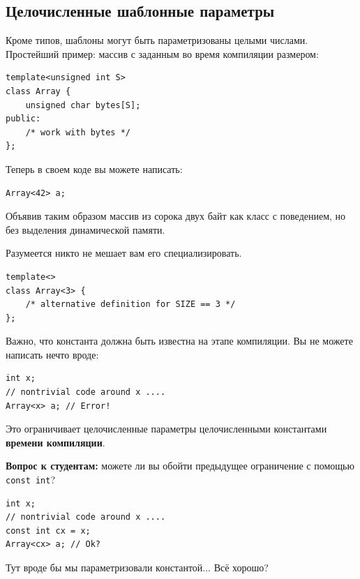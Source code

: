 \documentclass[a4paper,12pt,oneside]{book}
\newif\ifanswers
\begin{document}
\subsection{Целочисленные шаблонные параметры}\label{IntegerTParam}

Кроме типов, шаблоны могут быть параметризованы целыми числами. Простейший пример: массив с заданным во время компиляции размером:

\begin{lstlisting}
template<unsigned int S>
class Array {
    unsigned char bytes[S];
public:
    /* work with bytes */
};
\end{lstlisting}

Теперь в своем коде вы можете написать:

\begin{lstlisting}
Array<42> a;
\end{lstlisting}

Объявив таким образом массив из сорока двух байт как класс с поведением, но без выделения динамической памяти.

Разумеется никто не мешает вам его специализировать.

\begin{lstlisting}
template<>
class Array<3> {
    /* alternative definition for SIZE == 3 */
};
\end{lstlisting}

Важно, что константа должна быть известна на этапе компиляции. Вы не можете написать нечто вроде:

\begin{lstlisting}
int x;
// nontrivial code around x ....
Array<x> a; // Error!
\end{lstlisting}

Это ограничивает целочисленные параметры целочисленными константами \textbf{времени компиляции}.

\textbf{Вопрос к студентам:} можете ли вы обойти предыдущее ограничение с помощью \lstinline!const int!?

\begin{lstlisting}
int x;
// nontrivial code around x ....
const int cx = x;
Array<cx> a; // Ok?
\end{lstlisting}

Тут вроде бы мы параметризовали константой... Всё хорошо?

\ifanswers
Правильный ответ: нет, всё плохо. Несмотря на то, что \lstinline!cx! является константной переменной в смысле ограниченного доступа, она не является константой времени компиляции. Больше об этом см. (\ref{Constexpr}).
\fi
\end{document}
